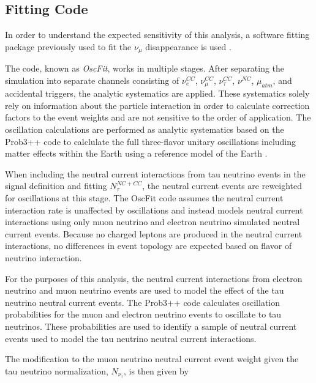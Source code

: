 \label{subsec:fitter}
\subsection{Fitting Code}
In order to understand the expected sensitivity of this analysis, a software fitting package previously used to fit the $\nu_\mu$ disappearance is used \cite{IceCube-Oscillation2013,IceCube-Oscillation2015,IceCube-Oscillation2018,}.

The code, known as \emph{OscFit}, works in multiple stages.
After separating the simulation into separate channels consisting of $\nu_e^{CC}$, $\nu_\mu^{CC}$, $\nu_\tau^{CC}$, $\nu^{NC}$, $\mu_{atm}$, and accidental triggers, the analytic systematics are applied.
These systematics solely rely on information about the particle interaction in order to calculate correction factors to the event weights and are not sensitive to the order of application.
The oscillation calculations are performed as analytic systematics based on the Prob3++ code \cite{prob3} to calclulate the full three-flavor unitary oscillations including matter effects within the Earth using a reference model of the Earth \cite{PREM}.

When including the neutral current interactions from tau neutrino events in the signal definition and fitting $N_\tau^{NC+CC}$, the neutral current events are reweighted for oscillations at this stage.
The OscFit code assumes the neutral current interaction rate is unaffected by oscillations and instead models neutral current interactions using only muon neutrino and electron neutrino simulated neutral current events.
Because no charged leptons are produced in the neutral current interactions, no differences in event topology are expected based on flavor of neutrino interaction.

For the purposes of this analysis, the neutral current interactions from electron neutrino and muon neutrino events are used to model the effect of the tau neutrino neutral current events.
The Prob3++ code calculates oscillation probabilities for the muon and electron neutrino events to oscillate to tau neutrinos.
These probabilities are used to identify a sample of neutral current events used to model the tau neutrino neutral current interactions.

The modification to the muon neutrino neutral current event weight given the tau neutrino normalization, $N_{\nu_\tau}$, is then given by


